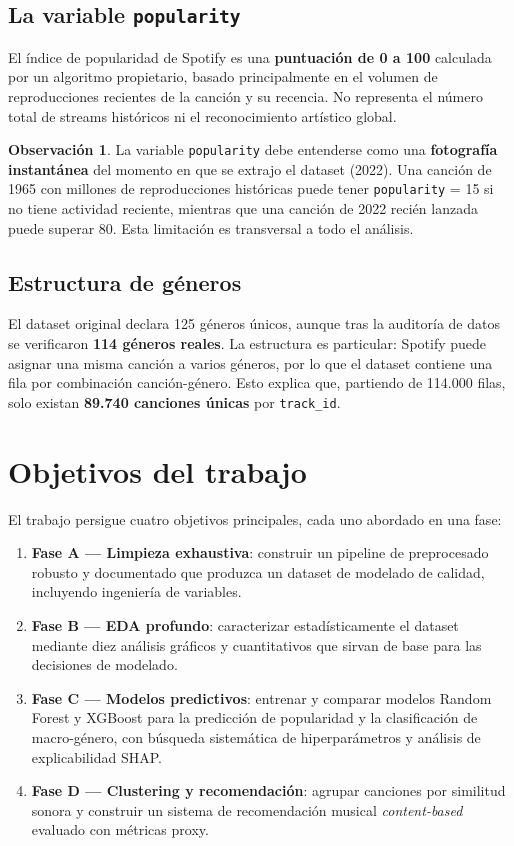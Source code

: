 \documentclass[12pt, a4paper, twoside]{book}
\theoremstyle{definition}
\newtheorem{observacion}{Observación}[chapter]
\begin{document}
\subsection{La variable \texttt{popularity}}

El índice de popularidad de Spotify es una \textbf{puntuación de 0 a 100}
calculada por un algoritmo propietario, basado principalmente en el volumen de
reproducciones recientes de la canción y su recencia. No representa el número
total de streams históricos ni el reconocimiento artístico global.

\begin{observacion}
La variable \texttt{popularity} debe entenderse como una \textbf{fotografía
instantánea} del momento en que se extrajo el dataset (2022). Una canción de 1965
con millones de reproducciones históricas puede tener \texttt{popularity} = 15 si
no tiene actividad reciente, mientras que una canción de 2022 recién lanzada puede
superar 80. Esta limitación es transversal a todo el análisis.
\end{observacion}

\subsection{Estructura de géneros}

El dataset original declara 125 géneros únicos, aunque tras la auditoría de datos
se verificaron \textbf{114 géneros reales}. La estructura es particular: Spotify
puede asignar una misma canción a varios géneros, por lo que el dataset contiene
una fila por combinación canción-género. Esto explica que, partiendo de 114.000
filas, solo existan \textbf{89.740 canciones únicas} por \texttt{track\_id}.

\section{Objetivos del trabajo}

El trabajo persigue cuatro objetivos principales, cada uno abordado en una fase:

\begin{enumerate}
  \item \textbf{Fase A — Limpieza exhaustiva}: construir un pipeline de
        preprocesado robusto y documentado que produzca un dataset de
        modelado de calidad, incluyendo ingeniería de variables.
  \item \textbf{Fase B — EDA profundo}: caracterizar estadísticamente el
        dataset mediante diez análisis gráficos y cuantitativos que sirvan de
        base para las decisiones de modelado.
  \item \textbf{Fase C — Modelos predictivos}: entrenar y comparar modelos
        Random Forest y XGBoost para la predicción de popularidad y la
        clasificación de macro-género, con búsqueda sistemática de
        hiperparámetros y análisis de explicabilidad SHAP.
  \item \textbf{Fase D — Clustering y recomendación}: agrupar canciones por
        similitud sonora y construir un sistema de recomendación musical
        \textit{content-based} evaluado con métricas proxy.
\end{enumerate}
\end{document}
